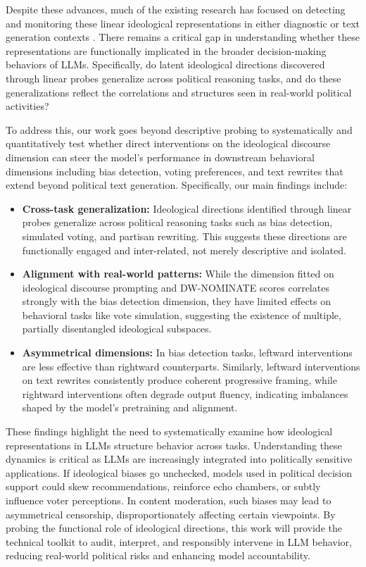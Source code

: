 \documentclass[11pt]{article}
\begin{document}
Despite these advances, much of the existing research has focused on detecting and monitoring these linear ideological representations in either diagnostic \citep{gurneeLanguageModelsRepresent2023, tiggesLinearRepresentationsSentiment2023} or text generation contexts \citep{marksGeometryTruthEmergent2023, kimLinearRepresentationsPolitical2025}. There remains a critical gap in understanding whether these representations are functionally implicated in the broader decision-making behaviors of LLMs. Specifically, do latent ideological directions discovered through linear probes generalize across political reasoning tasks, and do these generalizations reflect the correlations and structures seen in real-world political activities?

To address this, our work goes beyond descriptive probing to systematically and quantitatively test whether direct interventions on the ideological discourse dimension can steer the model’s performance in downstream behavioral dimensions including bias detection, voting preferences, and text rewrites that extend beyond political text generation. Specifically, our main findings include:
\begin{itemize}
    \item \textbf{Cross-task generalization:} Ideological directions identified through linear probes generalize across political reasoning tasks such as bias detection, simulated voting, and partisan rewriting. This suggests these directions are functionally engaged and inter-related, not merely descriptive and isolated.
    \item \textbf{Alignment with real-world patterns:} While the dimension fitted on ideological discourse prompting and DW-NOMINATE scores \citep{carrollMeasuringBiasUncertainty2009} correlates strongly with the bias detection dimension, they have limited effects on behavioral tasks like vote simulation, suggesting the existence of multiple, partially disentangled ideological subspaces.
    \item \textbf{Asymmetrical dimensions:} In bias detection tasks, leftward interventions are less effective than rightward counterparts. Similarly, leftward interventions on text rewrites consistently produce coherent progressive framing, while rightward interventions often degrade output fluency, indicating imbalances shaped by the model’s pretraining and alignment.
\end{itemize}

These findings highlight the need to systematically examine how ideological representations in LLMs structure behavior across tasks. Understanding these dynamics is critical as LLMs are increasingly integrated into politically sensitive applications. If ideological biases go unchecked, models used in political decision support could skew recommendations, reinforce echo chambers, or subtly influence voter perceptions. In content moderation, such biases may lead to asymmetrical censorship, disproportionately affecting certain viewpoints. By probing the functional role of ideological directions, this work will provide the technical toolkit to audit, interpret, and responsibly intervene in LLM behavior, reducing real-world political risks and enhancing model accountability.
\end{document}
